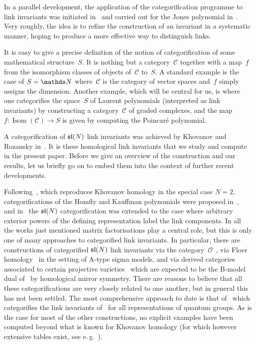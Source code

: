 \documentclass{compositio}
\theoremstyle{definition}
\numberwithin{equation}{section}
\begin{document}
\medskip

In a parallel development, the application of the categorification programme to link invariants was initiated in~\cite{cf9405183} and carried out for the Jones polynomial in~\cite{k9908171}. Very roughly, the idea is to refine the construction of an invariant in a systematic manner, hoping to produce a more effective way to distinguish links. 

It is easy to give a precise definition of the notion of categorification of some mathematical structure~$S$. It is nothing but a category~$\mathcal C$ together with a map~$f$ from the isomorphism classes of objects of~$\mathcal C$ to~$S$. A standard example is the case of $S=\nN$ where~$\mathcal C$ is the category of vector spaces and~$f$ simply assigns the dimension. Another example, which will be central for us, is where one categorifies the space~$S$ of Laurent polynomials (interpreted as link invariants) by constructing a category~$\mathcal C$ of graded complexes, and the map $f:\operatorname{Isom}(\mathcal C)\longrightarrow S$ is given by computing the Poincar\'e polynomial. 

A categorification of $\mathfrak{sl}(N)$ link invariants was achieved by Khovanov and Rozansky in~\cite{kr0401268}. It is these homological link invariants that we study and compute in the present paper. Before we give an overview of the construction and our results, let us briefly go on to embed them into the context of further recent developments. 

Following~\cite{kr0401268}, which reproduces Khovanov homology in the special case $N=2$, categorifications of the Homfly and Kauffman polynomials were proposed in~\cite{kr0505056, kr0701333}, and in~\cite{y0906.0220, w0907.0695} the $\mathfrak{sl}(N)$ categorification was extended to the case where arbitrary exterior powers of the defining representation label the link components. In all the works just mentioned matrix factorisations play a central role, but this is only one of many approaches to categorified link invariants. In particular, there are constructions of categorified $\mathfrak{sl}(N)$ link invariants via the category~$\mathcal O$~\cite{sCatTLcTCpf, ms0709.1971, s0701045}, via Floer homology~\cite{ss0405089, m0601629} in the setting of A-type sigma models, and via derived categories associated to certain projective varieties~\cite{ck0701194, ck0710.3216} which are expected to be the B-model dual of~\cite{ss0405089, m0601629} by homological mirror symmetry. There are reasons to believe that all these categorifications are very closely related to one another, but in general this has not been settled. The most comprehensive approach to date is that of~\cite{w1005.4559} which categorifies the link invariants of~\cite{RT1990, RT1991} for all representations of quantum groups. As is the case for most of the other constructions, no explicit examples have been computed beyond what is known for Khovanov homology (for which however extensive tables exist, see e.\,g.~\cite{bnKhovanov11crossings}). 
\end{document}
